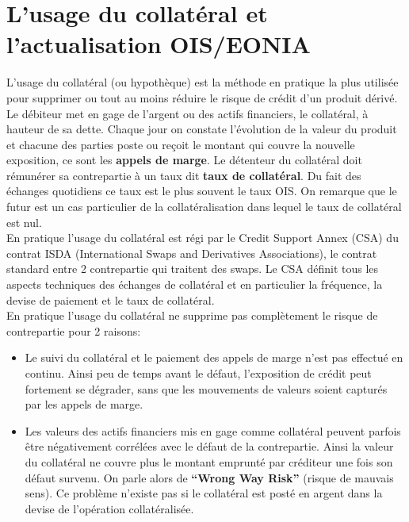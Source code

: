 \documentclass{article}
\begin{document}
\section*{L’usage du collatéral et l’actualisation OIS/EONIA}

L’usage du collatéral (ou hypothèque) est la méthode en pratique la plus utilisée pour supprimer ou tout au moins réduire le risque de crédit d'un produit dérivé. Le débiteur met en gage de l’argent ou des actifs financiers, le collatéral, à hauteur de sa dette. Chaque jour on constate l’évolution de la valeur du produit et chacune des parties poste ou reçoit le montant qui couvre la nouvelle exposition, ce sont les \textbf{appels de marge}. Le détenteur du collatéral doit rémunérer sa contrepartie à un taux dit \textbf{taux de collatéral}. Du fait des échanges quotidiens ce taux est le plus souvent le taux OIS. On remarque que le futur est un cas particulier de la collatéralisation dans lequel le taux de collatéral est nul.\\

En pratique l’usage du collatéral est régi par le Credit Support Annex (CSA) du contrat ISDA (International Swaps and Derivatives Associations), le contrat standard entre 2 contrepartie qui traitent des swaps. Le CSA définit tous les aspects techniques des échanges de collatéral et en particulier la fréquence, la devise de paiement et le taux de collatéral.\\

En pratique l’usage du collatéral ne supprime pas complètement le risque de contrepartie pour 2 raisons:
\begin{itemize}

\item Le suivi du collatéral et le paiement des appels de marge n’est pas effectué en continu. Ainsi peu de temps avant le défaut, l’exposition de crédit peut fortement se dégrader, sans que les mouvements de valeurs soient capturés par les appels de marge.\\

\item Les valeurs des actifs financiers mis en gage comme collatéral peuvent parfois être négativement corrélées avec le défaut de la contrepartie. Ainsi la valeur du collatéral ne couvre plus le montant emprunté par créditeur une fois son défaut survenu. On parle alors de \textbf{“Wrong Way Risk”} (risque de mauvais sens). Ce problème n’existe pas si le collatéral est posté en argent dans la devise de l’opération collatéralisée.\\

\end{itemize}
\end{document}
